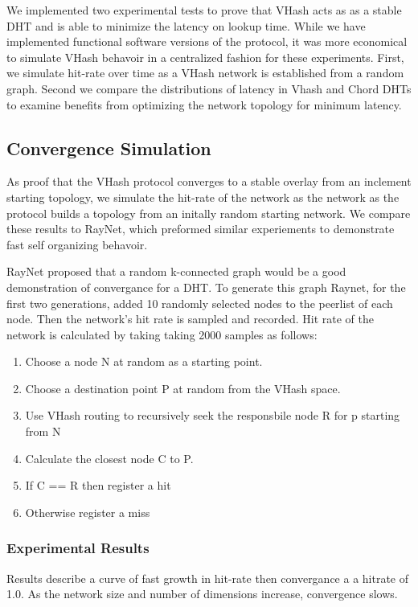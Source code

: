 \documentclass{IEEEtran}
\begin{document}
We implemented two experimental tests to prove that VHash acts as as a stable DHT and is able to minimize the latency on lookup time.
While we have implemented functional software versions of the protocol, it was more economical to simulate VHash behavoir in a centralized fashion for these experiments.
First, we simulate hit-rate over time as a VHash network is established from a random graph.
Second we compare the distributions of latency in Vhash and Chord DHTs to examine benefits from optimizing the network topology for minimum latency.

\subsection{Convergence Simulation}
As proof that the VHash protocol converges to a stable overlay from an inclement starting topology, we simulate the hit-rate of the network as the network as the protocol builds a topology from an initally random starting network.
We compare these results to RayNet, which preformed similar experiements to demonstrate fast self organizing behavoir.

RayNet proposed that a random k-connected graph would be a good demonstration of convergance for a DHT.
To generate this graph Raynet, for the first two generations, added 10 randomly selected nodes to the peerlist of each node.
Then the network's hit rate is sampled and recorded.
Hit rate of the network is calculated by taking taking 2000 samples as follows:
\begin{enumerate}
            \item{Choose a node N at random as a starting point.}
            \item{Choose a destination point P at random from the VHash space.}
            \item{Use VHash routing to recursively seek the responsbile node R for p starting from N}
            \item{Calculate the closest node C to P.}
            \item{If C == R then register a hit}
            \item{Otherwise register a miss}
\end{enumerate}

\subsubsection{Experimental Results}
Results describe a curve of fast growth in hit-rate then convergance a a hitrate of 1.0.
As the network size and number of dimensions increase, convergence slows.
\end{document}
